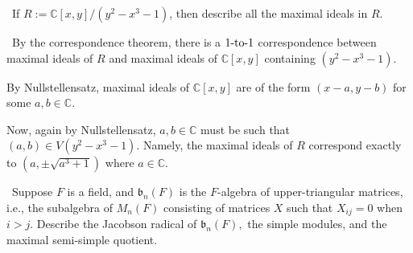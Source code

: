 \documentclass[12pt]{AlgebraQual}
\begin{document}
\begin{problem} $\,$
If $R:=\mathbb{C}[x,y]/(y^2-x^3-1)$, then describe all the maximal ideals in $R.$
\end{problem}


\begin{solution}$\,$
By the correspondence theorem, there is a $1\text{-to-}1$ correspondence between maximal ideals of $R$ and maximal ideals of $\mathbb{C}[x,y]$ containing $(y^2-x^3-1).$

By Nullstellensatz, maximal ideals of $\mathbb{C}[x,y]$ are of the form $(x-a,y-b)$ for some $a,b\in\mathbb{C}$.

Now, again by Nullstellensatz, $a,b\in\mathbb{C}$ must be such that $(a,b)\in V(y^2-x^3-1)$. Namely, the maximal ideals of $R$ correspond exactly to $(a,\pm\sqrt{a^3+1})$ where $a\in\mathbb{C}.$
\end{solution}
\newpage


\begin{problem} $\,$
Suppose $F$ is a field, and $\mathfrak{b}_n(F)$ is the $F$-algebra of upper-triangular matrices, i.e., the subalgebra of $M_n(F)$ consisting of matrices $X$ such that $X_{ij}=0$ when $i>j$. Describe the Jacobson radical of $\mathfrak{b}_n(F),$ the simple modules, and the maximal semi-simple quotient.
\end{problem}
\end{document}
